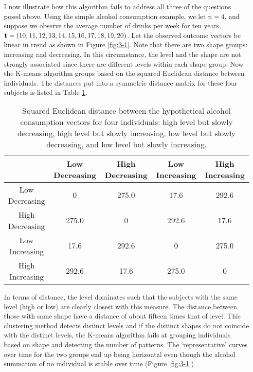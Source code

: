 I now illustrate how this algorithm fails to address all three of the questions posed above. Using the simple alcohol consumption example, we let $n=4$, and suppose we observe the average number of drinks per week for ten years, $\mathbf t=(10,11,12,13,14,15,16,17,18,19,20)$. Let the observed outcome vectors be linear in trend as shown in Figure \ref{fig:3-1}. Note that there are two shape groups: increasing and decreasing. In this circumstance, the level and the shape are not strongly associated since there are different levels within each shape group. Now the K-means algorithm groups based on the squared Euclidean distance between individuals. The distances put into a symmetric distance matrix for these four subjects is listed in Table \ref{tab:3-1}. 
\begin{table}[h]
\begin{center}
\begin{tabular}{c|cccc}
&Low Decreasing& High Decreasing&Low Increasing&High Increasing\\
\hline
Low Decreasing&0&275.0&17.6&292.6\\
High Decreasing&275.0  &0 &  292.6 &17.6 \\                     
Low Increasing& 17.6 &292.6  &0   &275.0   \\          
High Increasing& 292.6 &17.6 &275.0   &0 
\end{tabular}
\end{center}
\caption{Squared Euclidean distance between the hypothetical alcohol consumption vectors for four individuals: high level but slowly decreasing, high level but slowly increasing, low level but slowly decreasing, and low level but slowly increasing. }
\label{tab:3-1}
\end{table}
In terms of distance, the level dominates such that the subjects with the same level (high or low) are clearly closest with this measure. The distance between those with same shape have a distance of about fifteen times that of level. This clustering method detects distinct levels and if the distinct shapes do not coincide with the distinct levels, the K-means algorithm fails at grouping individuals based on shape and detecting the number of patterns. The `representative' curves over time for the two groups end up being horizontal even though the alcohol summation of no individual is stable over time (Figure \ref{fig:3-1}).

